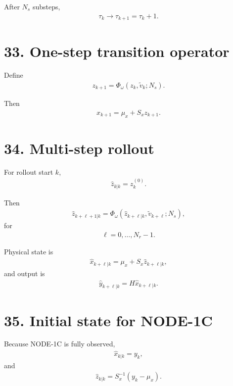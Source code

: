 \documentclass[11pt]{article}
\begin{document}
After \(N_s\) substeps,
\begin{align}
\boxed{
\tau_k\rightarrow\tau_{k+1}=\tau_k+1.
}
\tag{N3.120}
\end{align}

\section*{33. One-step transition operator}

Define
\begin{align}
\boxed{
z_{k+1}
=
\Phi_\omega(z_k,\widetilde v_k;N_s).
}
\tag{N3.121}
\end{align}

Then
\begin{align}
\boxed{
x_{k+1}=\mu_x+S_xz_{k+1}.
}
\tag{N3.122}
\end{align}

\section*{34. Multi-step rollout}

For rollout start \(k\),
\begin{align}
\widehat z_{k|k}=z_k^{(0)}.
\end{align}

Then
\begin{align}
\boxed{
\widehat z_{k+\ell+1|k}
=
\Phi_\omega
(\widehat z_{k+\ell|k},\widetilde v_{k+\ell};N_s),
}
\tag{N3.123}
\end{align}
for
\begin{align}
\ell=0,\ldots,N_r-1.
\end{align}

Physical state is
\begin{align}
\boxed{
\widehat x_{k+\ell|k}
=
\mu_x+S_x\widehat z_{k+\ell|k},
}
\tag{N3.124}
\end{align}
and output is
\begin{align}
\boxed{
\widehat y_{k+\ell|k}
=
H\widehat x_{k+\ell|k}.
}
\tag{N3.125}
\end{align}

\section*{35. Initial state for NODE-1C}

Because NODE-1C is fully observed,
\begin{align}
\boxed{\widehat x_{k|k}=y_k,}
\tag{N3.126}
\end{align}
and
\begin{align}
\boxed{
\widehat z_{k|k}
=
S_x^{-1}(y_k-\mu_x).
}
\tag{N3.127}
\end{align}
\end{document}
